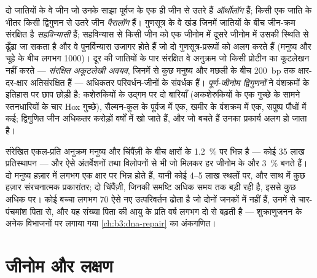 \begin{definition}[तुलनात्मक जीनोमिकी]\label{def:b3:genomics:comparative}
दो जातियों के वे जीन जो उनके साझा पूर्वज के एक ही जीन से उतरे हैं
\emph{ऑर्थोलॉग} हैं; किसी एक जाति के भीतर किसी द्विगुणन से उतरे जीन
\emph{पैरालॉग} हैं। गुणसूत्र के वे खंड जिनमें जातियों के बीच जीन-क्रम
संरक्षित है \emph{सहविन्यासी} हैं; सहविन्यास से किसी जीन को एक जीनोम
में दूसरे जीनोम में उसकी स्थिति से ढूँढ़ा जा सकता है और वे
पुनर्विन्यास उजागर होते हैं जो दो गुणसूत्र-प्ररूपों को अलग करते हैं
(मनुष्य और चूहे के बीच लगभग \num{1000})। दूर की जातियों के पार संरक्षित
वे अनुक्रम जो किसी प्रोटीन का कूटलेखन नहीं करते ---
\emph{संरक्षित अकूटलेखी अवयव}, जिनमें से कुछ मनुष्य और मछली के बीच
\qty{200}{bp} तक क्षार-दर-क्षार अतिसंरक्षित हैं --- अधिकतर परिवर्धन-जीनों
के संवर्धक हैं। \emph{पूर्ण-जीनोम द्विगुणनों} ने वंशक्रमों के इतिहास
पर छाप छोड़ी है: कशेरुकियों के उद्गम पर दो बारियाँ (अकशेरुकियों के एक
गुच्छे के सामने स्तनधारियों के चार Hox गुच्छे), सैल्मन-कुल के पूर्वज
में एक, खमीर के वंशक्रम में एक, सपुष्प पौधों में कई; द्विगुणित जीन
अधिकतर करोड़ों वर्षों में खो जाते हैं, और जो बचते हैं उनका प्रकार्य
अलग हो जाता है।
\end{definition}

\begin{example}[मनुष्य और चिंपैंज़ी]\label{ex:b3:genomics:chimp}
संरेखित एकल-प्रति अनुक्रम मनुष्य और चिंपैंज़ी के बीच क्षारों के
\qty{1.2}{\%} पर भिन्न है --- कोई \num{35} लाख प्रतिस्थापन --- और ऐसे
अंतर्वेशनों तथा विलोपनों से भी जो मिलकर हर जीनोम के और \qty{3}{\%}
बनते हैं। दो मनुष्य हज़ार में लगभग एक क्षार पर भिन्न होते हैं, यानी कोई
\numrange{4}{5} लाख स्थलों पर, और साथ में कुछ हज़ार संरचनात्मक
प्रकारांतर; दो चिंपैंज़ी, जिनकी समष्टि अधिक समय तक बड़ी रही है, इससे
कुछ अधिक पर। कोई बच्चा लगभग \num{70} ऐसे नए उत्परिवर्तन ढोता है जो
दोनों जनकों में नहीं हैं, उनमें से चार-पंचमांश पिता से, और यह संख्या
पिता की आयु के प्रति वर्ष लगभग दो से बढ़ती है --- शुक्राणुजनन के अनेक
विभाजनों पर लगाया गया \cref{ch:b3:dna-repair} का अंकगणित।
\end{example}

\section{जीनोम और लक्षण}

